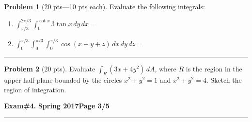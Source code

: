 \documentclass[12pt]{article}
\theoremstyle{definition}
\newtheorem{problem}{Problem}
\begin{document}
\bigskip
\begin{problem}[20 pts---10 pts each]
Evaluate the following integrals:
\begin{enumerate}
\item $\displaystyle{\int_{\pi/3}^{2\pi/3} \int_0^{\cot x} 3\tan x\, dy\, dx =}$ \framebox{\textcolor{white}{$\Bigg($} \hspace{1cm}}
\vspace{2cm}
\item $\displaystyle{\int_0^{\pi/3} \int_0^{\pi/3} \int_0^{\pi/3} \cos(x+y+z)\, dx \, dy\, dz =}$ \framebox{\textcolor{white}{$\Bigg($} \hspace{9cm}}
\vspace{4cm}
\end{enumerate}
\end{problem}
\hrule
\begin{problem}[20 pts]
Evaluate $\displaystyle{\int_R (3x+4y^2)\, dA}$, where $R$ is the region in the upper half-plane bounded by the circles
$x^2+y^2=1$ and $x^2+y^2=4$.  Sketch the region of integration.

\vspace{1cm}
\begin{flushright}

\vspace{3cm}
\end{flushright}
\end{problem}

\newpage

\hfill{\large\bf Exam\#4.}\hfill{\large\bf
  Spring 2017}\hfill{\large\bf Page 3/5}\hrule
\end{document}

